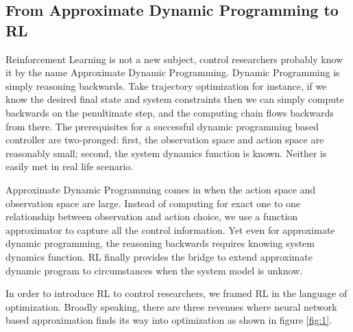 \documentclass[journal]{IEEEtran}
\begin{document}
\subsection{From Approximate Dynamic Programming to RL}

Reinforcement Learning is not a new subject, control researchers probably know it by the name Approximate Dynamic Programming. Dynamic Programming is simply reasoning backwards. Take trajectory optimization for instance, if we know the desired final state and system constraints then we can simply compute backwards on the penultimate step, and the computing chain flows backwards from there. The prerequisites for a successful dynamic programming based controller are two-pronged: first, the observation space and action space are reasonably small; second, the system dynamics function is known. Neither is easily met in real life scenario.

Approximate Dynamic Programming comes in when the action space and observation space are large. Instead of computing for exact one to one relationship between observation and action choice, we use a function approximator to capture all the control information. Yet even for approximate dynamic programming, the reasoning backwards requires knowing system dynamics function. RL finally provides the bridge to extend approximate dynamic program to circumstances when the system model is unknow.

In order to introduce RL to control researchers, we framed RL in the language of optimization. Broadly speaking, there are three revenues where neural network based approximation finds its way into optimization as shown in figure \ref{fig:1}.
\end{document}
